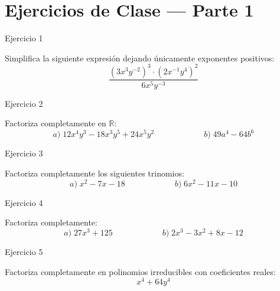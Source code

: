 \documentclass[aspectratio=169]{beamer}
\begin{document}
\section{Ejercicios de Clase — Parte 1}

\begin{frame}{Ejercicio 1}
  \begin{mwejercicio}
    Simplifica la siguiente expresión dejando únicamente exponentes positivos:
    $$\frac{(3x^3 y^{-2})^3 \cdot (2x^{-1} y^4)^2}{6x^5 y^{-3}}$$
  \end{mwejercicio}
  \vspace{3.5cm}
\end{frame}
\begin{frame}{Ejercicio 2}
  \begin{mwejercicio}
    Factoriza completamente en $\mathbb{R}$:
    $$a)\; 12x^4 y^3 - 18x^3 y^5 + 24x^5 y^2 \qquad\qquad\qquad b)\; 49a^4 - 64b^6$$
  \end{mwejercicio}
  \vspace{3.5cm}
\end{frame}
\begin{frame}{Ejercicio 3}
  \begin{mwejercicio}
    Factoriza completamente los siguientes trinomios:
    $$a)\; x^2 - 7x - 18 \qquad\qquad\qquad b)\; 6x^2 - 11x - 10$$
  \end{mwejercicio}
  \vspace{3.5cm}
\end{frame}
\begin{frame}{Ejercicio 4}
  \begin{mwejercicio}
    Factoriza completamente:
    $$a)\; 27x^3 + 125 \qquad\qquad\qquad b)\; 2x^3 - 3x^2 + 8x - 12$$
  \end{mwejercicio}
  \vspace{3.5cm}
\end{frame}
\begin{frame}{Ejercicio 5}
  \begin{mwejercicio}
    Factoriza completamente en polinomios irreducibles con coeficientes reales:
    $$x^4 + 64y^4$$
  \end{mwejercicio}
  \vspace{3.5cm}
\end{frame}
\end{document}
